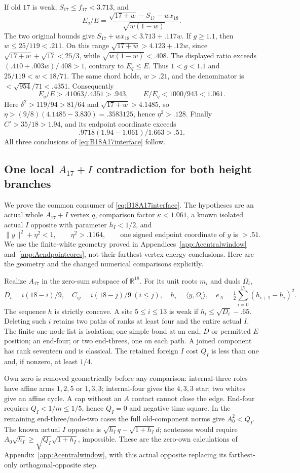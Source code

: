 \documentclass[11pt]{article}
\theoremstyle{definition}
\theoremstyle{remark}
\newcommand{\ip}[2]{\langle #1,#2\rangle}
\newcommand{\norm}[1]{\lVert #1\rVert}
\begin{document}
If old \(17\) is weak, \(S_{17}\leq f_{17}<3.713\), and
\[
 E_q/E=\frac{\sqrt{17+w}-S_{17}-wx_{18}}{\sqrt{w(1-w)}}.
\]
The two original bounds give \(S_{17}+wx_{18}<3.713+.117w\).
If \(g\geq1.1\), then \(w\leq25/119<.211\).
On this range \(\sqrt{17+w}>4.123+.12w\), since
\(\sqrt{17+w}+\sqrt{17}<25/3\), while
\(\sqrt{w(1-w)}<.408\). The displayed ratio exceeds
\((.410+.003w)/.408>1\), contrary to \(E_q\leq E\).
Thus \(1<g<1.1\) and \(25/119<w<18/71\).
The same chord holds, \(w>.21\), and the denominator is
\(<\sqrt{954}/71<.4351\).
Consequently
\[
 E_q/E>.41063/.4351>.943,\qquad E/E_q<1000/943<1.061.
\]
Here \(\delta^2>119/94>81/64\) and
\(\sqrt{17+w}>4.1485\), so
\(\eta>(9/8)(4.1485-3.830)=.3583125\), hence \(\eta^2>.128\).
Finally \(C'>35/18>1.94\), and its endpoint coordinate exceeds
\[
 .9718(1.94-1.061)/1.663>.51 .
\]
All three conclusions of \eqref{eq:B18A17interface} follow.

\subsection{One local \(A_{17}+I\) contradiction for both height branches}
\label{app:B18localA17}
We prove the common consumer of \eqref{eq:B18A17interface}.
The hypotheses are an actual whole \(A_{17}+I\) vertex \(q\),
comparison factor \(\kappa<1.061\), a known isolated actual \(I\)
opposite with parameter \(h_I<1/2\), and
\[
 \norm y^2+\eta^2<1,\qquad \eta^2>.1164,\qquad
 \text{one signed endpoint coordinate of \(y\) is }>.51 .
\]
We use the finite-white geometry proved in
Appendices~\ref{app:Acentralwindow} and~\ref{app:Aendpointcores},
not their farthest-vertex energy conclusions.
Here are the geometry and the changed numerical comparisons explicitly.

Realize \(A_{17}\) in the zero-sum subspace of \(\mathbb R^{18}\).
For its unit roots \(m_i\) and duals \(\Omega_i\),
\[
 D_i=i(18-i)/9,\quad C_{ij}=i(18-j)/9\ (i\leq j),\quad
 h_i=\ip y{\Omega_i},\quad
 e_A=\tfrac12\sum_{i=0}^{17}(h_{i+1}-h_i)^2 .
\]
The sequence \(h\) is strictly concave.
A site \(5\leq i\leq13\) is weak if \(h_i\leq\sqrt{D_i}-.65\).
Deleting such \(i\) retains two paths of ranks at least four and
the entire actual \(I\). The finite one-node list is isolation;
one simple bond at an end, \(D\) or permitted \(E\) position;
an end-four; or two end-threes, one on each path.
A joined component has rank seventeen and is classical.
The retained foreign \(I\) cost \(Q_I\) is less than one and,
if nonzero, at least \(1/4\).

Own zero is removed geometrically before any comparison:
internal-three roles have affine arms \(1,2,5\) or \(1,3,3\);
internal-four gives the \(4,3,3\) star; two whites give an affine
cycle. A cap without an \(A\) contact cannot close the edge.
End-four requires \(Q_I<1/m\leq1/5\), hence \(Q_I=0\) and
negative time square. In the remaining end-three/node-two cases
the full old-component norms give \(A_0^2<Q_I\).
The known actual \(I\) opposite is
\(\sqrt{h_I}q-\sqrt{1+h_I}d\); acuteness would require
\(A_0\sqrt{h_I}\geq\sqrt{Q_I}\sqrt{1+h_I}\), impossible.
These are the zero-own calculations of
Appendix~\ref{app:Acentralwindow}, with this actual opposite
replacing its farthest-only orthogonal-opposite step.
\end{document}

